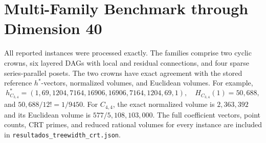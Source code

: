 \documentclass[10pt]{article}
\begin{document}
\section{Multi-Family Benchmark through Dimension 40}

All reported instances were processed exactly. The families comprise two cyclic crowns, six layered DAGs with local and residual connections, and four sparse series-parallel posets. The two crowns have exact agreement with the stored reference $h^*$-vectors, normalized volumes, and Euclidean volumes. For example,
\[
h_{C_{3,4}}^*=(1,69,1204,7164,16906,16906,7164,1204,69,1),
\quad H_{C_{3,4}}(1)=50{,}688,
\]
and $50{,}688/12!=1/9450$. For $C_{4,4}$, the exact normalized volume is $2{,}363{,}392$ and its Euclidean volume is $577/5{,}108{,}103{,}000$. The full coefficient vectors, point counts, CRT primes, and reduced rational volumes for every instance are included in \texttt{resultados\_treewidth\_crt.json}.

\begin{table}[htbp]
\centering
\caption{Complete benchmark inventory and measured exact-computation metrics. Time is wall-clock seconds; memory is Python \texttt{tracemalloc} peak in MB; $r$ is the number of CRT primes. The exact Euclidean volume is $H_P(1)/d!$.}
\label{tab:benchmark}
\scriptsize
\setlength{\tabcolsep}{3.2pt}
\end{table}
\end{document}
